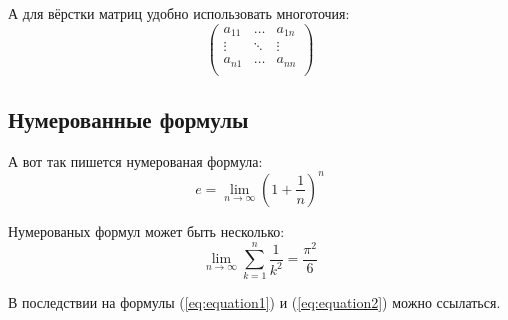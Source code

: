 А для вёрстки матриц удобно использовать многоточия:
$$
\left(
  \begin{array}{ccc}
  	a_{11} & \ldots & a_{1n} \\
  	\vdots & \ddots & \vdots \\
  	a_{n1} & \ldots & a_{nn} \\
  \end{array}
\right)
$$


\subsection{Нумерованные формулы} \label{subsect1_4_3}

А вот так пишется нумерованая формула:
\begin{equation}
  \label{eq:equation1}
  e = \lim_{n \to \infty} \left( 1+\frac{1}{n} \right) ^n
\end{equation}

Нумерованых формул может быть несколько:
\begin{equation}
  \label{eq:equation2}
  \lim_{n \to \infty} \sum_{k=1}^n \frac{1}{k^2} = \frac{\pi^2}{6}
\end{equation}

В последствии на формулы (\ref{eq:equation1}) и (\ref{eq:equation2}) можно ссылаться.


\clearpage
